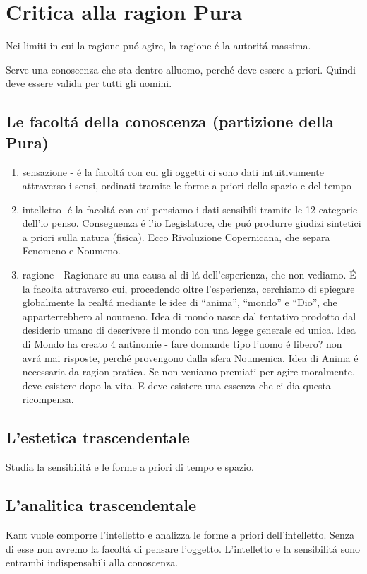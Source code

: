 \documentclass{article}
\begin{document}
\section{Critica alla ragion Pura}
Nei limiti in cui la ragione puó agire, la ragione é la autoritá massima.


Serve una conoscenza che sta dentro alluomo, perché deve essere a priori. Quindi deve essere valida per tutti gli uomini. 
\subsection*{Le facoltá della conoscenza (partizione della Pura)}
\begin{enumerate}
    \item sensazione - é la facoltá con cui gli oggetti ci sono dati intuitivamente attraverso i sensi, ordinati tramite le forme a priori dello spazio e del tempo
    \item intelletto- é la facoltá con cui pensiamo i dati sensibili tramite le 12 categorie dell'io penso. Conseguenza é l'io Legislatore, che puó produrre giudizi sintetici a priori sulla natura (fisica). Ecco Rivoluzione Copernicana, che separa Fenomeno e Noumeno.
    \item ragione - Ragionare su una causa al di lá dell'esperienza, che non vediamo. É la facolta attraverso cui, procedendo oltre l'esperienza, cerchiamo di spiegare globalmente la realtá mediante le idee di ``anima'', ``mondo'' e ``Dio'', che apparterrebbero al noumeno. Idea di mondo nasce dal tentativo prodotto dal desiderio umano di descrivere il mondo con una legge generale ed unica. Idea di Mondo ha creato 4 antinomie - fare domande tipo l'uomo é libero? non avrá mai risposte, perché provengono dalla sfera Noumenica. Idea di Anima é necessaria da ragion pratica. Se non veniamo premiati per agire moralmente, deve esistere dopo la vita. E deve esistere una essenza che ci dia questa ricompensa.
\end{enumerate}
\subsection{L'estetica trascendentale}
Studia la sensibilitá e le forme a priori di tempo e spazio.
\subsection{L'analitica trascendentale}
Kant vuole comporre l'intelletto e analizza le forme a priori dell'intelletto. Senza di esse non avremo la facoltá di pensare l'oggetto. L'intelletto e la sensibilitá sono entrambi indispensabili alla conoscenza.
\end{document}
